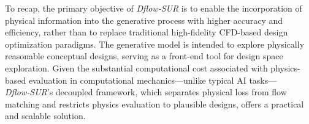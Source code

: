 To recap, the primary objective of \textit{Dflow‑SUR} is to enable the incorporation of physical information into the generative process with higher accuracy and efficiency, rather than to replace traditional high-fidelity CFD-based design optimization paradigms. The generative model is intended to explore physically reasonable conceptual designs, serving as a front-end tool for design space exploration. Given the substantial computational cost associated with physics-based evaluation in computational mechanics—unlike typical AI tasks—\textit{Dflow‑SUR}'s decoupled framework, which separates physical loss from flow matching and restricts physics evaluation to plausible designs, offers a practical and scalable solution.